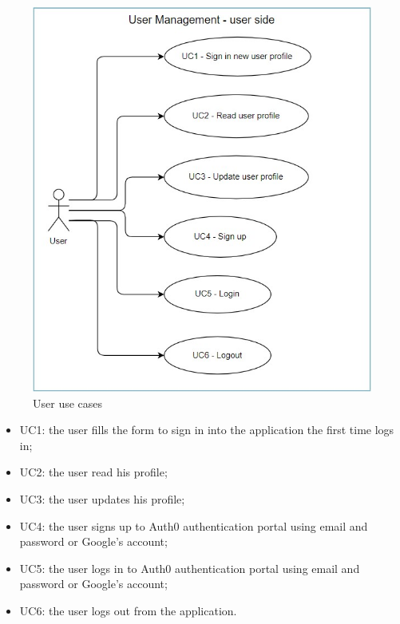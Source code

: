 \begin{figure} [H]
	\centering
	\includegraphics[scale=1.2]{../Img/UC_user}
	\caption{User use cases}\label{}
\end{figure}

\begin{itemize}
	\item UC1: the user fills the form to sign in into the application the first time logs in;
	\item UC2: the user read his profile;
	\item UC3: the user updates his profile;
	\item UC4: the user signs up to Auth0 authentication portal using email and password or Google's account;
	\item UC5: the user logs in to Auth0 authentication portal using email and password or Google's account;
	\item UC6: the user logs out from the application.
\end{itemize}

